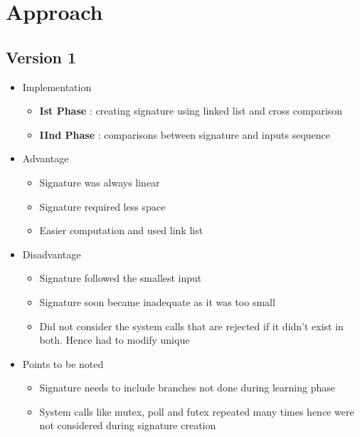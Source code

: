 \chapter{Approach}
\section{Version 1}
\begin{itemize}
    \item[] Implementation 
        \begin{itemize}
            \item \textbf{Ist Phase} : creating signature using linked list and cross comparison
            \item \textbf{IInd Phase} : comparisons between signature and inputs sequence
        \end{itemize}
    \item[] {Advantage}
        \begin{itemize}
            \item Signature was always linear
            \item Signature required less space
            \item Easier computation and used link list
        \end{itemize}
    \item[] {Disadvantage}
        \begin{itemize}
            \item Signature followed the smallest input
            \item Signature soon became inadequate as it was too small
            \item Did not consider the system calls that are rejected if it didn't exist in both. Hence had to modify unique
        \end{itemize}
    \item[] {Points to be noted}
        \begin{itemize}
            \item Signature needs to include branches not done during learning phase
            \item System calls like mutex, poll and futex repeated many times hence were not considered during signature creation
        \end{itemize}
\end{itemize}
